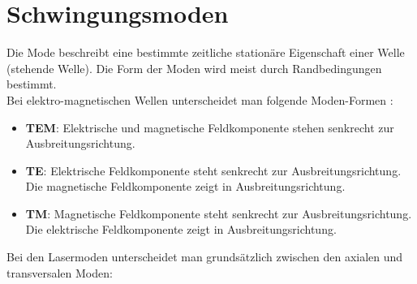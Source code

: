 \section{Schwingungsmoden}
Die Mode beschreibt eine bestimmte zeitliche stationäre Eigenschaft einer Welle (stehende Welle).
Die Form der Moden wird meist durch Randbedingungen bestimmt.\\
Bei elektro-magnetischen Wellen unterscheidet man folgende Moden-Formen \citep[vgl.][]{laser}:
\begin{itemize}
    \item \textbf{TEM}:
    Elektrische und magnetische Feldkomponente stehen senkrecht zur Ausbreitungsrichtung.
    \item \textbf{TE}:
    Elektrische Feldkomponente steht senkrecht zur Ausbreitungsrichtung. Die magnetische Feldkomponente zeigt in Ausbreitungsrichtung.
    \item \textbf{TM}:
    Magnetische Feldkomponente steht senkrecht zur Ausbreitungsrichtung. Die elektrische Feldkomponente zeigt in Ausbreitungsrichtung.
\end{itemize}
Bei den Lasermoden unterscheidet man grundsätzlich zwischen den axialen und transversalen Moden:

